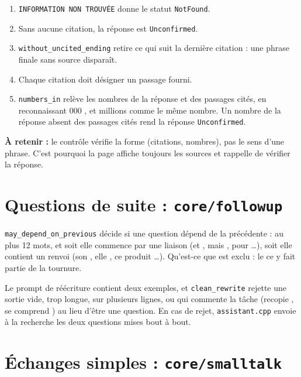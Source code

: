 \documentclass[11pt,a4paper]{article}
\newcommand{\retenir}[1]{\par\smallskip\noindent\colorbox{vigie!8}{\parbox{\dimexpr\linewidth-2\fboxsep}{\small\textbf{À retenir :} #1}}\par\smallskip}
\newcommand{\fichier}[1]{\texttt{#1}}
\begin{document}
\begin{enumerate}
  \item \texttt{INFORMATION NON TROUVÉE} donne le statut \texttt{NotFound}.
  \item Sans aucune citation, la réponse est \texttt{Unconfirmed}.
  \item \texttt{without\_uncited\_ending} retire ce qui suit la dernière citation : une phrase finale sans source disparaît.
  \item Chaque citation doit désigner un passage fourni.
  \item \texttt{numbers\_in} relève les nombres de la réponse et des passages cités, en reconnaissant  000 \fg,  \fg{} et  millions \fg{} comme le même nombre. Un nombre de la réponse absent des passages cités rend la réponse \texttt{Unconfirmed}.
\end{enumerate}

\retenir{le contrôle vérifie la forme (citations, nombres), pas le sens d'une phrase. C'est pourquoi la page affiche toujours les sources et rappelle de vérifier la réponse.}

\section{Questions de suite : \texttt{core/followup}}

\texttt{may\_depend\_on\_previous} décide si une question dépend de la précédente : au plus 12 mots, et soit elle commence par une liaison (\og et \fg, \og mais \fg, \og pour \fg\dots), soit elle contient un renvoi (\og son \fg, \og elle \fg, \og ce produit \fg\dots). \og Qu'est-ce que \fg{} est exclu : le \og ce \fg{} y fait partie de la tournure.



Le prompt de réécriture contient deux exemples, et \texttt{clean\_rewrite} rejette une sortie vide, trop longue, sur plusieurs lignes, ou qui commente la tâche (\og recopie \fg, \og se comprend \fg) au lieu d'être une question. En cas de rejet, \fichier{assistant.cpp} envoie à la recherche les deux questions mises bout à bout.

\section{Échanges simples : \texttt{core/smalltalk}}
\end{document}
